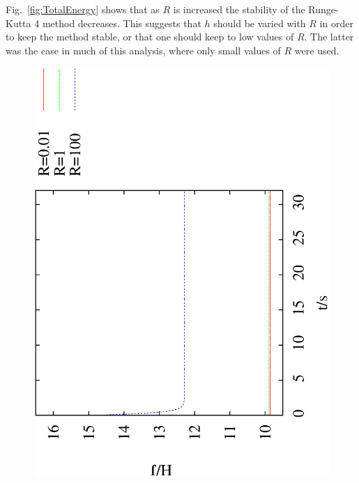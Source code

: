\documentclass[10pt,a4paper]{article}
\begin{document}
Fig.~\ref{fig:TotalEnergy} shows that as $R$ is increased the stability of the Runge-Kutta 4 method decreases. This suggests that $h$ should be varied with $R$ in order to keep the method stable, or that one should keep to low values of $R$. The latter was the case in much of this analysis, where only small values of $R$ were used.

\begin{figure}[h!]
\begin{center}
\includegraphics[scale = 0.3, angle =-90]{EnergyTest0.1.eps}

\end{center}
\end{figure}
\end{document}
